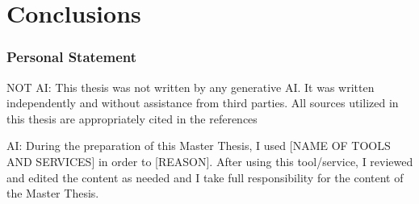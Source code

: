 

\chapter{Conclusions}

\subsection{Personal Statement}

NOT AI:
This thesis was not written by any generative AI. It was written independently and
without assistance from third parties. All sources utilized in this thesis are appropriately cited in the references

AI:
During the preparation of this Master Thesis, I used [NAME OF TOOLS AND SERVICES] in order to [REASON]. After using this tool/service, I reviewed and edited the content as needed and I take full responsibility for the content of the Master Thesis.
